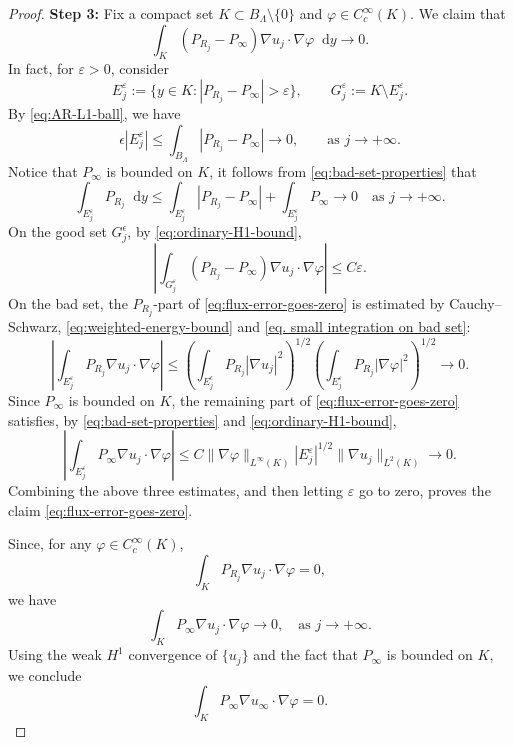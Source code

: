 \documentclass[10pt,a4paper]{amsart}
\numberwithin{equation}{section}
\newcommand{\dd}{\mathop{}\!\mathrm{d}}%
\begin{document}
\begin{proof}
\noindent
{\bf Step 3:}
Fix a compact set
$K\subset B_\Lambda\setminus\{0\}$ and
$\varphi\in C_c^\infty(K)$.  We claim that
\begin{equation}\label{eq:flux-error-goes-zero}
    \int_K(P_{R_j}-P_\infty)
    \nabla u_j\cdot\nabla\varphi\dd y
    \to0.
\end{equation}
In fact, for $\varepsilon>0$, consider
\[
    E_j^\varepsilon
    :=\{y\in K:|P_{R_j}-P_\infty|>\varepsilon\},
    \qquad
    G_j^\varepsilon:=K\setminus E_j^\varepsilon.
\]
By \cref{eq:AR-L1-ball}, we have
\begin{equation}\label{eq:bad-set-properties}
    \epsilon|E_j^\varepsilon|
    \leq \int_{B_\Lambda }|P_{R_j}-P_{\infty}|
    \to0,
    \qquad
    \text{as }j\to+\infty.
\end{equation}
Notice that $P_\infty$ is bounded on $K$, it follows from \cref{eq:bad-set-properties} that
\begin{equation}\label{eq. small integration on bad set}
    \int_{E_j^\varepsilon}P_{R_j}\dd y
    \leq
    \int_{E_j^\varepsilon}|P_{R_j}-P_\infty|
    +\int_{E_j^\varepsilon}P_\infty
    \to0\quad
    \text{as }j\to+\infty.
\end{equation}
On the good set $G_j^\epsilon$, by \cref{eq:ordinary-H1-bound},
\[
\left|
\int_{G_j^\varepsilon}(P_{R_j}-P_\infty)
\nabla u_j\cdot\nabla\varphi
\right|
\leq C\varepsilon.
\]
On the bad set, the $P_{R_j}$-part of \cref{eq:flux-error-goes-zero} is estimated by Cauchy--Schwarz, \cref{eq:weighted-energy-bound} and \cref{eq. small integration on bad set}:
\[
\left|
\int_{E_j^\varepsilon}P_{R_j}
\nabla u_j\cdot\nabla\varphi
\right|
\leq
\left(\int_{E_j^\epsilon}P_{R_j}|\nabla u_j|^2\right)^{1/2}
\left(\int_{E_j^\varepsilon}
P_{R_j}|\nabla\varphi|^2\right)^{1/2}
\to0.
\]
Since $P_\infty$ is bounded on $K$, the remaining part of \cref{eq:flux-error-goes-zero} satisfies, by \cref{eq:bad-set-properties} and \cref{eq:ordinary-H1-bound},
\[
\left|
\int_{E_j^\varepsilon}P_\infty
\nabla u_j\cdot\nabla\varphi
\right|
\leq
C\|\nabla\varphi\|_{L^\infty(K)}
|E_j^\varepsilon|^{1/2}
\|\nabla u_j\|_{L^2(K)}
\to0.
\]
Combining the above three estimates, and then letting
$\varepsilon$ go to zero, proves the claim
\cref{eq:flux-error-goes-zero}.

Since, for any $\varphi\in C_c^\infty(K)$,
\[
    \int_{K} P_{R_j}\nabla u_j\cdot\nabla\varphi=0,
\]
we have
\[
    \int_{K} P_\infty\nabla u_j\cdot\nabla\varphi\to0,\quad 
    \text{as }j\to+\infty.
\]
Using the weak $H^1$ convergence of $\{u_j\}$ and the fact that $P_\infty$ is bounded
on $K$, we conclude
\begin{equation}\label{eq. punctured equation}
    \int_{K} P_\infty\nabla u_\infty\cdot\nabla\varphi=0.
\end{equation}


\end{proof}
\end{document}
